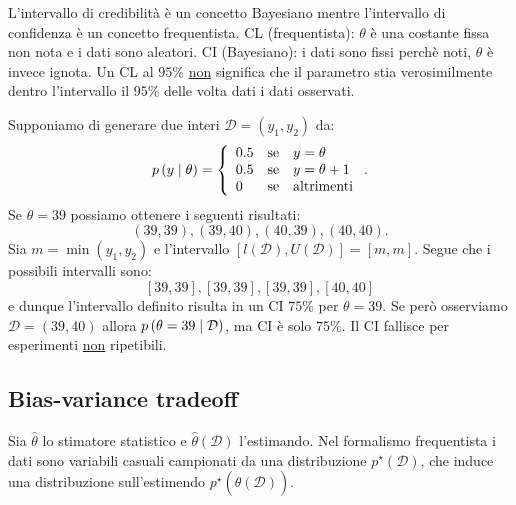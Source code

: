 \documentclass[10pt]{article}
\begin{document}
    \begin{observation}
        L'intervallo di credibilità è un concetto Bayesiano mentre l'intervallo di
        confidenza è un concetto frequentista. CL (frequentista): \( \theta \) è una costante fissa
        non nota e i dati sono aleatori. CI (Bayesiano): i dati sono fissi perchè noti,
        \( \theta \) è invece ignota. Un CL al \( 95\% \) \underline{non} significa che il
        parametro stia verosimilmente dentro l'intervallo il \( 95\% \) delle volta dati
        i dati osservati.
    \end{observation}

    \begin{example}
        Supponiamo di generare due interi \( \mathcal{D} = \left( y_1, y_2 \right) \) da:
        \[
            p \left( y\cond \theta \right) = \left\{
            \begin{array}{l@{\quad\text{se}\quad}l}
                0.5 & y = \theta \\
                0.5 & y = \theta + 1 \\
                0 & \text{altrimenti} \\
            \end{array}\right..
        \]
        Se \( \theta = 39 \) possiamo ottenere i seguenti risultati:
        \[
            \left( 39, 39 \right), \left( 39, 40 \right), \left( 40, 39 \right), \left( 40, 40 \right).
        \]
        Sia \( m = \min \left( y_1, y_2 \right) \) e l'intervallo
        \( \left[ l(\mathcal{D}), U(\mathcal{D}) \right] = [m, m] \). Segue che i possibili intervalli
        sono:
        \[
            [39, 39], [39, 39], [39, 39], [40, 40]
        \]
        e dunque l'intervallo definito risulta in un CI \( 75\% \) per \( \theta = 39\).
        Se però osserviamo \( \mathcal{D} = \left( 39, 40 \right) \) allora
        \( p \left( \theta=39 \mid \mathcal{D} \right) \), ma CI è solo \( 75\% \). Il CI fallisce per esperimenti
        \underline{non} ripetibili.
    \end{example}

\subsection{Bias-variance tradeoff}
    Sia \( \hat{\theta} \) lo stimatore statistico e \( \hat{\theta} \left( \mathcal{D} \right) \) l'estimando. Nel formalismo
    frequentista i dati sono variabili casuali campionati da una distribuzione
    \( p^\star \left( \mathcal{D} \right)\), che induce una distribuzione sull'estimendo
    \( p^\star \left( \hat{\theta} \left( \mathcal{D} \right) \right) \).
\end{document}
